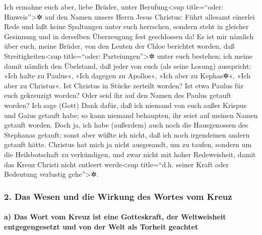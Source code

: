 Ich ermahne euch aber, liebe Brüder, unter
Berufung\textless sup title=``oder: Hinweis''\textgreater✲ auf den Namen
unsers Herrn Jesus Christus: Führt allesamt einerlei Rede und laßt keine
Spaltungen unter euch herrschen, sondern steht in gleicher Gesinnung und
in derselben Überzeugung fest geschlossen da!  Es ist mir
nämlich über euch, meine Brüder, von den Leuten der Chloe berichtet
worden, daß Streitigkeiten\textless sup title=``oder:
Parteiungen''\textgreater✲ unter euch bestehen;  ich
meine damit nämlich den Übelstand, daß jeder von euch (als seine Losung)
ausspricht: »Ich halte zu Paulus«, »Ich dagegen zu Apollos«, »Ich aber
zu Kephas✲«, »Ich aber zu Christus«.  Ist Christus in
Stücke zerteilt worden? Ist etwa Paulus für euch gekreuzigt worden? Oder
seid ihr auf den Namen des Paulus getauft worden?  Ich
sage (Gott) Dank dafür, daß ich niemand von euch außer Krispus und Gaius
getauft habe;  so kann niemand behaupten, ihr seiet auf
meinen Namen getauft worden.  Doch ja, ich habe
(außerdem) auch noch die Hausgenossen des Stephanas getauft; sonst aber
wüßte ich nicht, daß ich noch irgendeinen andern getauft hätte.
 Christus hat mich ja nicht ausgesandt, um zu taufen,
sondern um die Heilsbotschaft zu verkündigen, und zwar nicht mit hoher
Redeweisheit, damit das Kreuz Christi nicht entleert werde\textless sup
title=``d.h. seiner Kraft oder Bedeutung verlustig gehe''\textgreater✲.

\hypertarget{das-wesen-und-die-wirkung-des-wortes-vom-kreuz}{%
\subsubsection{2. Das Wesen und die Wirkung des Wortes vom
Kreuz}\label{das-wesen-und-die-wirkung-des-wortes-vom-kreuz}}

\hypertarget{a-das-wort-vom-kreuz-ist-eine-gotteskraft-der-weltweisheit-entgegengesetzt-und-von-der-welt-als-torheit-geachtet}{%
\paragraph{a) Das Wort vom Kreuz ist eine Gotteskraft, der Weltweisheit
entgegengesetzt und von der Welt als Torheit
geachtet}\label{a-das-wort-vom-kreuz-ist-eine-gotteskraft-der-weltweisheit-entgegengesetzt-und-von-der-welt-als-torheit-geachtet}}

